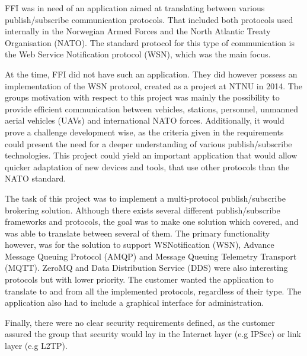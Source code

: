 FFI was in need of an application aimed at translating between various publish/subscribe communication protocols. That included both protocols used internally in the Norwegian Armed Forces and the North Atlantic Treaty Organisation (NATO). The standard protocol for this type of communication is the Web Service Notification protocol (WSN), which was the main focus.

At the time, FFI did not have such an application. They did however possess an implementation of the WSN protocol, created as a project at NTNU in 2014. The groups motivation with respect to this project was mainly the possibility to provide efficient communication between vehicles, stations, personnel, unmanned aerial vehicles (UAVs) and international NATO forces. Additionally, it would prove a challenge development wise, as the criteria given in the requirements could present the need for a  deeper understanding of various publish/subscribe technologies. This project could yield an important application that would allow quicker adaptation of new devices and tools, that use other protocols than the NATO standard.

The task of this project was to implement a multi-protocol publish/subscribe brokering solution. Although there exists several different publish/subscribe frameworks and protocols, the goal was to make one solution which covered, and was able to translate between several of them. The primary functionality however, was for the solution to support WSNotification (WSN), Advance Message Queuing Protocol (AMQP) and Message Queuing Telemetry Transport (MQTT). ZeroMQ and Data Distribution Service (DDS) were also interesting protocols but with lower priority. The customer wanted the application to translate to and from all the implemented protocols, regardless of their type. The application also had to include a graphical interface for administration.

Finally, there were no clear security requirements defined, as the customer assured the group that security would lay in the Internet layer (e.g IPSec) or link layer (e.g L2TP).


\clearpage